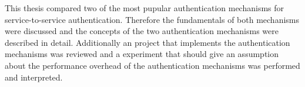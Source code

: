 This thesis compared two of the most pupular authentication mechanisms for service-to-service authentication.
Therefore the fundamentals of both mechanisms were discussed and the concepts of the two authentication mechanisms were described in detail.
Additionally an project that implements the authentication mechanisms was reviewed and a experiment that should give an assumption about the performance overhead of the authentication mechanisms was performed and interpreted.

